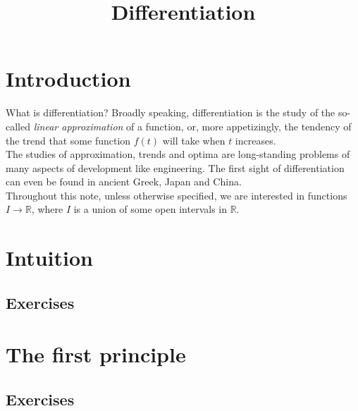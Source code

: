 \documentclass{fts_m2}
\title{Differentiation}
\begin{document}
    \maketitle\clearpage
    \section*{Introduction}
    What is differentiation? Broadly speaking, differentiation is the study of the so-called \textit{linear approximation} of a function, or, more appetizingly, the tendency of the trend that some function $f(t)$ will take when $t$ increases.\\
    The studies of approximation, trends and optima are long-standing problems of many aspects of development like engineering. The first sight of differentiation can even be found in ancient Greek, Japan and China.\\
    Throughout this note, unless otherwise specified, we are interested in functions $I\to\mathbb R$, where $I$ is a union of some open intervals in $\mathbb R$.

    \section{Intuition}
    
    \subsection*{Exercises}
      
    
    \section{The first principle}
    
    \subsection*{Exercises}
    
\end{document}
